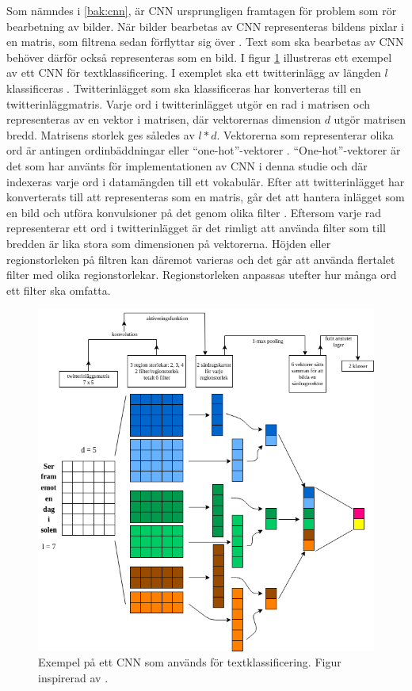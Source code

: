\documentclass{kaumasters} %
\begin{document}
Som nämndes i \ref{bak:cnn}, är CNN ursprungligen framtagen för problem som rör bearbetning av bilder. När bilder bearbetas av CNN representeras bildens pixlar i en matris, som filtrena sedan förflyttar sig över \cite{cnn:004}. Text som ska bearbetas av CNN behöver därför också representeras som en bild. I figur \ref{fig:cnntext} illustreras ett exempel av ett CNN för textklassificering. I exemplet ska ett twitterinlägg av längden $l$ klassificeras \cite{cnn:002}. Twitterinlägget som ska klassificeras har konverteras till en twitterinläggmatris. Varje ord i twitterinlägget utgör en rad i matrisen och representeras av en vektor i matrisen, där vektorernas dimension $d$ utgör matrisen bredd.  Matrisens storlek ges således av $l*d$.  Vektorerna som representerar olika ord är antingen ordinbäddningar \cite{wiki:016} eller “one-hot”-vektorer \cite{cnn:004}.  “One-hot”-vektorer är det som har använts för implementationen av CNN i denna studie och där indexeras varje ord i datamängden till ett vokabulär. Efter att twitterinlägget har konverterats till att representeras som en matris, går det att hantera inlägget som en bild och utföra konvulsioner på det genom olika filter \cite{cnn:002}. Eftersom varje rad representerar ett ord i twitterinlägget är det rimligt att använda filter som till bredden är lika stora som dimensionen på vektorerna. Höjden eller regionstorleken på filtren kan däremot varieras och det går att använda flertalet filter med olika regionstorlekar. Regionstorleken anpassas utefter hur många ord ett filter ska omfatta. 

\begin{figure}[H]
\includegraphics[width=12cm]{cnn_text}
\centering
\caption{Exempel på ett CNN som används för textklassificering. Figur inspirerad av \cite{cnn:002}.}
\label{fig:cnntext}
\end{figure}
\end{document}
